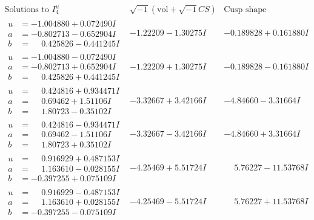 \documentclass[1p]{elsarticle_modified}
\theoremstyle{definition}
\newcommand{\I}{\sqrt{-1}}
\begin{document}
$$\begin{array}{c|c|c}  
\text{Solutions to }I^u_{4}& \I (\text{vol} + \sqrt{-1}CS) & \text{Cusp shape}\\
 \hline 
\begin{aligned}
u &= -1.004880 + 0.072490 I \\
a &= -0.802713 - 0.652904 I \\
b &= \phantom{-}0.425826 - 0.441245 I\end{aligned}
 & -1.22209 - 1.30275 I & -0.189828 + 0.161880 I \\ \hline\begin{aligned}
u &= -1.004880 - 0.072490 I \\
a &= -0.802713 + 0.652904 I \\
b &= \phantom{-}0.425826 + 0.441245 I\end{aligned}
 & -1.22209 + 1.30275 I & -0.189828 - 0.161880 I \\ \hline\begin{aligned}
u &= \phantom{-}0.424816 + 0.934471 I \\
a &= \phantom{-}0.69462 + 1.51106 I \\
b &= \phantom{-}1.80723 - 0.35102 I\end{aligned}
 & -3.32667 + 3.42166 I & -4.84660 - 3.31664 I \\ \hline\begin{aligned}
u &= \phantom{-}0.424816 - 0.934471 I \\
a &= \phantom{-}0.69462 - 1.51106 I \\
b &= \phantom{-}1.80723 + 0.35102 I\end{aligned}
 & -3.32667 - 3.42166 I & -4.84660 + 3.31664 I \\ \hline\begin{aligned}
u &= \phantom{-}0.916929 + 0.487153 I \\
a &= \phantom{-}1.163610 - 0.028155 I \\
b &= -0.397255 + 0.075109 I\end{aligned}
 & -4.25469 + 5.51724 I & \phantom{-}5.76227 - 11.53768 I \\ \hline\begin{aligned}
u &= \phantom{-}0.916929 - 0.487153 I \\
a &= \phantom{-}1.163610 + 0.028155 I \\
b &= -0.397255 - 0.075109 I\end{aligned}
 & -4.25469 - 5.51724 I & \phantom{-}5.76227 + 11.53768 I \\ \hline\begin{aligned}

\end{aligned}
\end{array}$$
\end{document}
